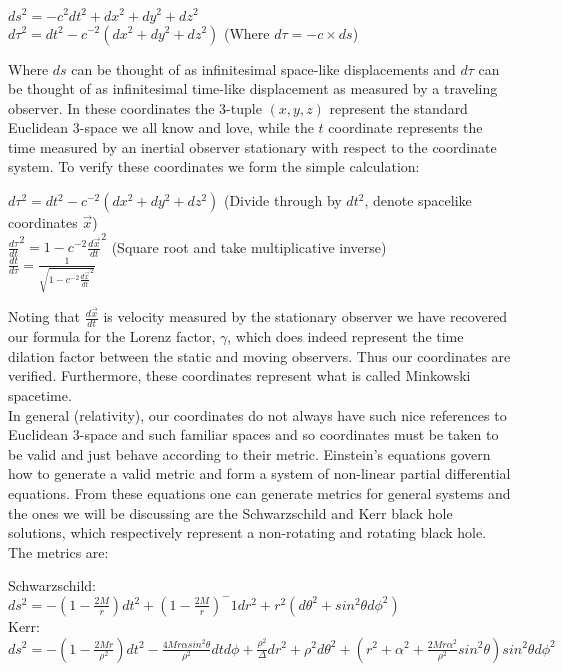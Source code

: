 \documentclass[]{article}
\begin{document}
\begin{center}
	$ds^2 = -c^2 dt^2 + dx^2+dy^2+dz^2$ \\
	$d \tau^2 = dt^2 - c^{-2} (dx^2+dy^2+dz^2)$ (Where $d\tau = -c \times ds$) 
\end{center} 

Where $ds$ can be thought of as infinitesimal space-like displacements and $d\tau$ can be thought of as infinitesimal time-like displacement as measured by a traveling observer. In these coordinates the 3-tuple $(x,y,z)$ represent the standard Euclidean 3-space we all know and love, while the $t$ coordinate represents the time measured by an inertial observer stationary with respect to the coordinate system. To verify these coordinates we form the simple calculation:

\begin{center}
	$d \tau^2 = dt^2 - c^{-2} (dx^2+dy^2+dz^2)$ (Divide through by $dt^2$, denote spacelike coordinates $\vec{x}$) \\
	$\frac{d\tau}{dt}^2 = 1 - c^{-2} \frac{d\vec{x}}{dt}^2$ (Square root and take multiplicative inverse) \\
	$\frac{dt}{d\tau} = \frac{1}{\sqrt{1- c^{-2} \frac{d\vec{x}}{dt}^2}}$
\end{center}

Noting that $\frac{d\vec{x}}{dt}$ is velocity measured by the stationary observer we have recovered our formula for the Lorenz factor, $\gamma$, which does indeed represent the time dilation factor between the static and moving observers. Thus our coordinates are verified. Furthermore, these coordinates represent what is called Minkowski spacetime. \\

In general (relativity), our coordinates do not always have such nice references to Euclidean 3-space and such familiar spaces and so coordinates must be taken to be valid and just behave according to their metric. Einstein's equations govern how to generate a valid metric and form a system of non-linear partial differential equations. From these equations one can generate metrics for general systems and the ones we will be discussing are the Schwarzschild and Kerr black hole solutions, which respectively represent a non-rotating and rotating black hole. The metrics are: \\

\begin{center}
	Schwarzschild: \\
	$ds^2 = -(1-\frac{2M}{r})dt^2 + (1-\frac{2M}{r})^-1 dr^2 + r^2(d\theta^2 + sin^2\theta d\phi^2)$ \\
	Kerr: \\
	$ds^2 = -(1 - \frac{2Mr}{\rho^2}) dt^2 - \frac{4Mr\alpha sin^2\theta}{\rho^2} dtd\phi + \frac{\rho^2}{\Delta}dr^2 + \rho^2 d\theta^2 + (r^2 + \alpha^2 + \frac{2Mr \alpha^2}{\rho^2}sin^2\theta )sin^2\theta d\phi^2$
\end{center}
\end{document}
